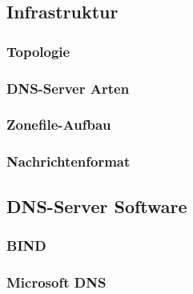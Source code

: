 \documentclass[a4paper, 11pt, toc=bibliography, toc=listof]{scrbook}
\begin{document}

			\subsection{Infrastruktur} %
			\label{sub:Infrastruktur}

				\subsubsection{Topologie} %
				\label{sub:Topologie}
				
				
				\subsubsection{DNS-Server Arten} %
				\label{sub:DNS-Server Arten}
				

				\subsubsection{Zonefile-Aufbau} %
				\label{sub:Zonefile-Aufbau}
				

				\subsubsection{Nachrichtenformat} %
				\label{sub:Nachrichtenformat}
				


			\subsection{DNS-Server Software} %
			\label{sub:DNS-Server Software}
			
				\subsubsection{BIND} %
				\label{sub:BIND}
				

				\subsubsection{Microsoft DNS} %
				\label{ssub:Microsoft DNS}
				
\end{document}
